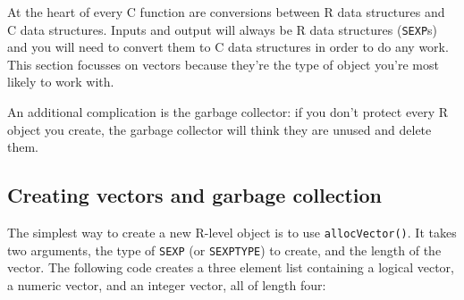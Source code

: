 
At the heart of every C function are conversions between R data
structures and C data structures. Inputs and output will always be R
data structures (\texttt{SEXP}s) and you will need to convert them to C
data structures in order to do any work. This section focusses on
vectors because they're the type of object you're most likely to work
with.

An additional complication is the garbage collector: if you don't
protect every R object you create, the garbage collector will think they
are unused and delete them.

\subsection{Creating vectors and garbage collection}

The simplest way to create a new R-level object is to use
\texttt{allocVector()}. It takes two arguments, the type of
\texttt{SEXP} (or \texttt{SEXPTYPE}) to create, and the length of the
vector. The following code creates a three element list containing a
logical vector, a numeric vector, and an integer vector, all of length
four: 

\begin{Shaded}
\begin{Highlighting}[]
\StringTok{ }\NormalTok{(} 


\NormalTok{)}
\NormalTok{()}
\CommentTok{#> [[1]]}
\CommentTok{#> }
\CommentTok{#> [[2]]}
\CommentTok{#> }
\CommentTok{#> [[3]]}
\end{Highlighting}
\end{Shaded}

